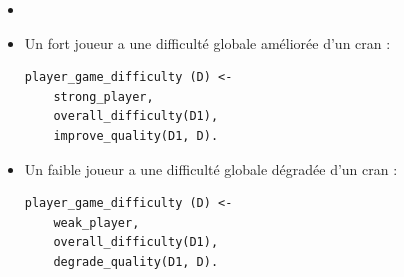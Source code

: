 \documentclass[a4paper, 12]{article}
\begin{document}
\begin{itemize}
\begin{Verbatim}
overall_difficult(D) <- 
	same_colours_order(D1),
	
\end{Verbatim}
\item 
\

\item Un fort joueur a une difficulté globale améliorée d’un cran :
\begin{Verbatim}
player_game_difficulty (D) <- 
	strong_player,
	overall_difficulty(D1),
	improve_quality(D1, D).
\end{Verbatim}
	
\item Un faible joueur a une difficulté globale dégradée d’un cran :
\begin{Verbatim}
player_game_difficulty (D) <- 
	weak_player,
	overall_difficulty(D1),
	degrade_quality(D1, D).
\end{Verbatim}

\end{itemize}


  
\end{document}
